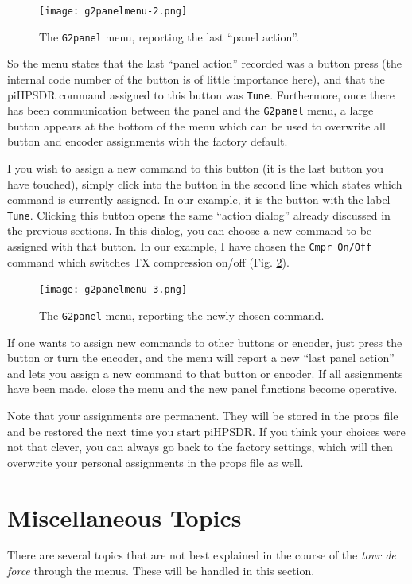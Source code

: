\documentclass[12pt]{book}
\def\bltt#1{\texttt{\color{blue}#1}}
\def\pH{pi\-HPSDR\xspace}
\begin{document}
\begin{figure}[ht]
\center
\texttt{[image: g2panelmenu-2.png]}
\caption{The \bltt{G2panel} menu, reporting the last ``panel action''.}
\label{fig:g2panelmenu-initial}
\end{figure}

So the menu states that the last ``panel action'' recorded was a button press (the internal code number
of the button is of little importance here), and that the \pH command assigned to this button was
\bltt{Tune}. Furthermore, once there has been communication between the panel and the \bltt{G2panel}
menu, a large button appears at the bottom of the menu which can be used to overwrite all button and
encoder assignments with the factory default.

I you wish to assign a new command to this button (it is the last button you have touched), simply
click into the button in the second line which states which command is currently assigned. In our
example, it is the button with the label \bltt{Tune}. Clicking this button opens the same
``action dialog'' already discussed in the previous sections. In this dialog, you can choose a
new command to be assigned with that button. In our example, I have chosen the \bltt{Cmpr On/Off}
command which switches TX compression on/off (Fig. \ref{fig:g2panelmenu-chosen}).

\begin{figure}[ht]
\center
\texttt{[image: g2panelmenu-3.png]}
\caption{The \bltt{G2panel} menu, reporting the newly chosen command.}
\label{fig:g2panelmenu-chosen}
\end{figure}

If one wants to assign new commands to other buttons or encoder, just press the button or turn the
encoder, and the menu will report a new ``last panel action'' and lets you assign a new command
to that button or encoder. If all assignments have been made, close the menu and the new panel
functions become operative.

Note that your assignments are permanent. They will be stored in the props file and be restored
the next time you start \pH. If you think your choices were not that clever, you can always go back
to the factory settings, which will then overwrite your personal assignments in the props file as well.
\chapter{Miscellaneous Topics}
There are several topics that are not best explained in the course of the \textit{tour de force} through
the menus. These will be handled in this section.
\end{document}
